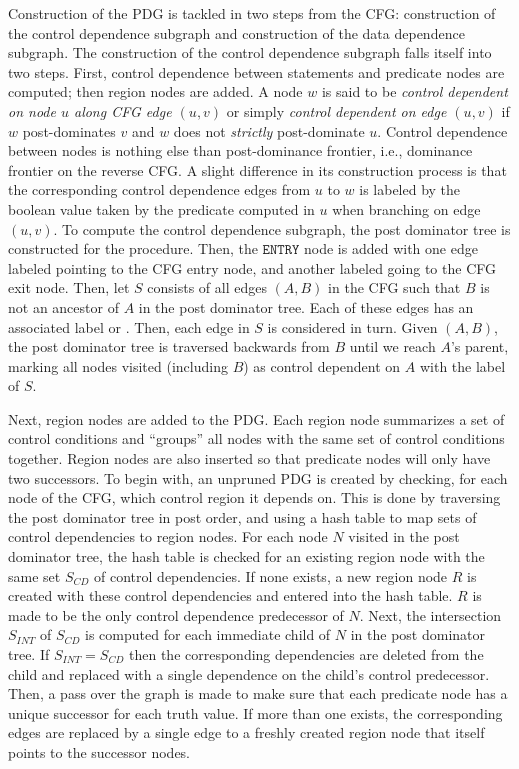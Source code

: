 {
  \def\CD{S_\textit{CD}}
  \def\INT{S_\textit{INT}}
Construction of the PDG is tackled in two steps from the CFG: 
construction of the control dependence subgraph and construction of the data dependence subgraph. 
The construction of the control dependence subgraph falls itself into two steps. 
First, control dependence between statements and predicate nodes are computed; 
then region nodes are added. 
A node $w$ is said to be \emph{control dependent on node $u$ along CFG edge $(u,v)$} or simply \emph{control dependent on edge $(u,v)$} if $w$ post-dominates $v$ and $w$ does not \emph{strictly} post-dominate $u$. 
Control dependence between nodes is nothing else than post-dominance frontier, i.e., dominance frontier on the reverse CFG. 
A slight difference in its construction process is that the corresponding control dependence edges from $u$ to $w$ is labeled by the boolean value taken by the predicate computed in $u$ when branching on edge $(u,v)$. 
To compute the control dependence subgraph, the post dominator tree is constructed for the procedure. 
Then, the $\texttt{ENTRY}$ node is added with one edge labeled \true pointing to the CFG entry node, and another labeled \false going to the CFG exit node. 
Then, let $S$ consists of all edges $(A,B)$ in the CFG such that $B$ is not an ancestor of $A$ in the post dominator tree. 
Each of these edges has an associated label \true or \false. 
Then, each edge in $S$ is considered in turn. 
Given $(A,B)$, the post dominator tree is traversed backwards from $B$ until we reach $A$'s parent, marking all nodes visited (including $B$) as control dependent on $A$ with the label of $S$.

Next, region nodes are added to the PDG. 
Each region node summarizes a set of control conditions and ``groups'' all nodes with the same set of control conditions together. 
Region nodes are also inserted so that predicate nodes will only have two successors. 
To begin with, an unpruned PDG is created by checking, for each node of the CFG, which control region it depends on. 
This is done by traversing the post dominator tree in post order, and using a hash table to map sets of control dependencies to region nodes. 
For each node $N$ visited in the post dominator tree, the hash table is checked for an existing region node with the same set $\CD$ of control dependencies. 
If none exists, a new region node $R$ is created with these control dependencies and entered into the hash table. 
$R$ is made to be the only control dependence predecessor of $N$. 
Next, the intersection $\INT$ of $\CD$ is computed for each immediate child of $N$ in the post dominator tree. 
If $\INT=\CD$ then the corresponding dependencies are deleted from the child and replaced with a single dependence on the child's control predecessor. 
Then, a pass over the graph is made to make sure that each predicate node has a unique successor for each truth value. 
If more than one exists, the corresponding edges are replaced by a single edge to a freshly created region node that itself points to the successor nodes.
}

